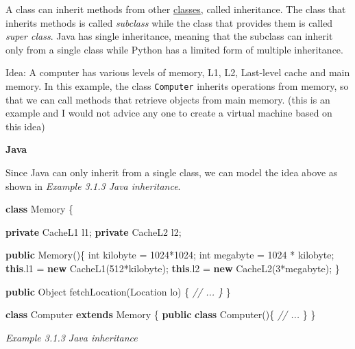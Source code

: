 \documentclass[]{article}
\newenvironment{Shaded}{\begin{snugshade}}{\end{snugshade}}
\newcommand{\KeywordTok}[1]{\textcolor[rgb]{0.13,0.29,0.53}{\textbf{{#1}}}}
\newcommand{\DataTypeTok}[1]{\textcolor[rgb]{0.13,0.29,0.53}{{#1}}}
\newcommand{\DecValTok}[1]{\textcolor[rgb]{0.00,0.00,0.81}{{#1}}}
\newcommand{\CommentTok}[1]{\textcolor[rgb]{0.56,0.35,0.01}{\textit{{#1}}}}
\newcommand{\FunctionTok}[1]{\textcolor[rgb]{0.00,0.00,0.00}{{#1}}}
\newcommand{\BuiltInTok}[1]{{#1}}
\newcommand{\NormalTok}[1]{{#1}}
\begin{document}
A class can inherit methods from other
\protect\hyperlink{classes}{classes}, called inheritance. The class that
inherits methods is called \emph{subclass} while the class that provides
them is called \emph{super class}. Java has single inheritance, meaning
that the subclass can inherit only from a single class while Python has
a limited form of multiple inheritance.

Idea: A computer has various levels of memory, L1, L2, Last-level cache
and main memory. In this example, the class \texttt{Computer} inherits
operations from memory, so that we can call methods that retrieve
objects from main memory. (this is an example and I would not advice any
one to create a virtual machine based on this idea)

\textbf{Java}

Since Java can only inherit from a single class, we can model the idea
above as shown in \emph{Example 3.1.3 Java inheritance}.

\begin{Shaded}
\begin{Highlighting}[]
\KeywordTok{class} \NormalTok{Memory \{}

  \KeywordTok{private} \NormalTok{CacheL1 l1;}
  \KeywordTok{private} \NormalTok{CacheL2 l2;}

  \KeywordTok{public} \FunctionTok{Memory}\NormalTok{()\{}
    \DataTypeTok{int} \NormalTok{kilobyte = }\DecValTok{1024}\NormalTok{*}\DecValTok{1024}\NormalTok{;}
    \DataTypeTok{int} \NormalTok{megabyte = }\DecValTok{1024} \NormalTok{* kilobyte;}
    \KeywordTok{this}\NormalTok{.}\FunctionTok{l1} \NormalTok{= }\KeywordTok{new} \FunctionTok{CacheL1}\NormalTok{(}\DecValTok{512}\NormalTok{*kilobyte);}
    \KeywordTok{this}\NormalTok{.}\FunctionTok{l2} \NormalTok{= }\KeywordTok{new} \FunctionTok{CacheL2}\NormalTok{(}\DecValTok{3}\NormalTok{*megabyte);}
  \NormalTok{\}}

  \KeywordTok{public} \BuiltInTok{Object} \FunctionTok{fetchLocation}\NormalTok{(}\BuiltInTok{Location} \NormalTok{lo) \{ }\CommentTok{// ... \}}
\NormalTok{\}}

\KeywordTok{class} \NormalTok{Computer }\KeywordTok{extends} \NormalTok{Memory \{}
  \KeywordTok{public} \KeywordTok{class} \FunctionTok{Computer}\NormalTok{()\{}
    \CommentTok{// ...}
  \NormalTok{\}}
\NormalTok{\}}
\end{Highlighting}
\end{Shaded}

\emph{Example 3.1.3 Java inheritance}
\end{document}
